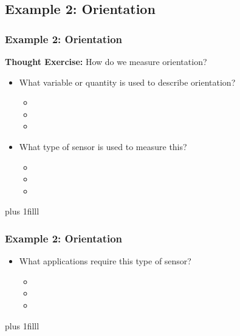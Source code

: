\documentclass[fleqn]{beamer} %
\newcommand{\sectionIsubsectionVtitle}{Example 2: Orientation}
\newcommand{\btVFill}{\vskip0pt plus 1filll}
\begin{document}
		\subsection{\sectionIsubsectionVtitle}\label{sectionIsubsectionV}		

			\begin{frame}
				\frametitle{\sectionIsubsectionVtitle}
				{\bf Thought Exercise:} How do we measure {\PR orientation}?        
	
				\begin{itemize}
					
					\item What variable or quantity is used to describe {\PR orientation}?                         
					\begin{itemize}
						\item
						\item
						\item	
					\end{itemize} \vspace{5mm}
					\item What type of sensor is used to measure this?
					\begin{itemize}
						\item
						\item
						\item	
					\end{itemize}	
					
				\end{itemize}
				
				\btVFill
	
			\end{frame}

			\begin{frame}
				\frametitle{\sectionIsubsectionVtitle}

				\begin{itemize}
					\item What applications require this type of sensor?
					\begin{itemize}
						\item \vspace{5mm}
						\item \vspace{5mm}
						\item \vspace{5mm}	
					\end{itemize}
				\end{itemize}
				
				\btVFill
			\end{frame}
\end{document}
